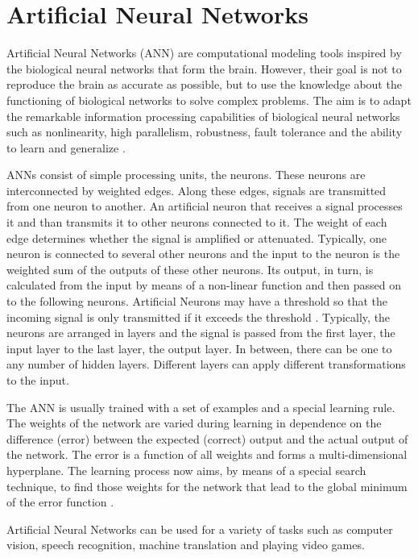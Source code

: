 \documentclass[11pt]{report}
\begin{document}
\section{Artificial Neural Networks}
Artificial Neural Networks (ANN) are computational modeling tools inspired by the
biological neural networks that form the brain. However, their goal is not to
reproduce the brain as accurate as possible, but to use the knowledge about
the functioning of biological networks to solve complex problems. The aim is to
adapt the remarkable information processing capabilities of biological neural
networks such as nonlinearity, high parallelism, robustness, fault tolerance and
 the ability to learn and generalize \cite{basheer2000artificial}.

ANNs consist of simple processing units, the neurons. These neurons are
interconnected by weighted edges. Along these edges, signals are transmitted
from one neuron to another. An artificial neuron that receives a signal
processes it and than transmits it to other neurons connected to it. The weight
of each edge determines whether the signal is amplified or attenuated.
Typically, one neuron is connected to several other neurons and the input to the
neuron is the weighted sum of the outputs of these other neurons. Its output, in
turn, is calculated from the input by means of a non-linear function and then
passed on to the following neurons. Artificial Neurons may have a threshold so that
the incoming signal is only transmitted if it exceeds the threshold
\cite{Kriesel2007NeuralNetworks}. Typically, the neurons are arranged in layers
and the signal is passed from the first layer, the input layer to the last
layer, the output layer. In between, there can be one to any number of hidden
layers. Different layers can apply different transformations to the input.

The ANN is usually trained with a set of examples and a special learning rule.
The weights of the network are varied during learning in dependence on the
difference (error) between the expected (correct) output and the actual output
of the network. The error is a function of all weights and forms a
multi-dimensional hyperplane. The learning process now aims, by means of a
special search technique, to find those weights for the network that lead to the
global minimum of the error function \cite{basheer2000artificial}.

Artificial Neural Networks can be used for a variety of tasks such as computer
vision, speech recognition, machine translation and playing video games. 
\end{document}
